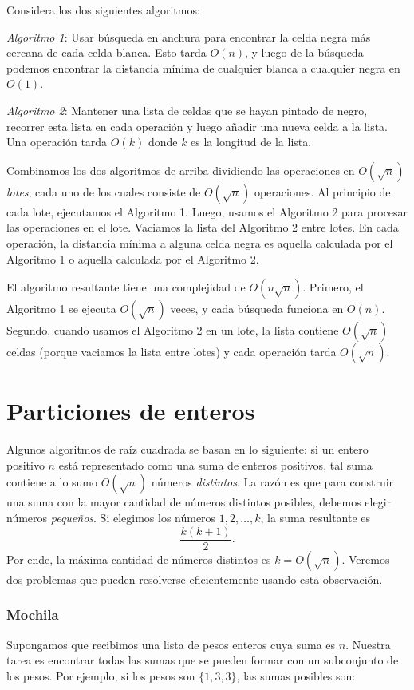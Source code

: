 Considera los dos siguientes algoritmos:

\emph{Algoritmo 1}: Usar búsqueda en anchura para encontrar la celda negra
más cercana de cada celda blanca. Esto tarda $O(n)$, y luego de la búsqueda
podemos encontrar la distancia mínima de cualquier blanca a cualquier negra
en $O(1)$.

\emph{Algoritmo 2}: Mantener una lista de celdas que se hayan pintado de
negro, recorrer esta lista en cada operación y luego añadir una nueva
celda a la lista. Una operación tarda $O(k)$ donde $k$ es la longitud
de la lista.

Combinamos los dos algoritmos de arriba dividiendo las operaciones en
$O(\sqrt n)$ \emph{lotes}, cada uno de los cuales consiste de $O(\sqrt n)$
operaciones. Al principio de cada lote, ejecutamos el Algoritmo 1. Luego,
usamos el Algoritmo 2 para procesar las operaciones en el lote. Vaciamos
la lista del Algoritmo 2 entre lotes. En cada operación, la distancia
mínima a alguna celda negra es aquella calculada por el Algoritmo 1
o aquella calculada por el Algoritmo 2.

El algoritmo resultante tiene una complejidad de $O(n \sqrt n)$. Primero,
el Algoritmo 1 se ejecuta $O(\sqrt n)$ veces, y cada búsqueda funciona en
$O(n)$. Segundo, cuando usamos el Algoritmo 2 en un lote, la lista contiene
$O(\sqrt n)$ celdas (porque vaciamos la lista entre lotes) y cada operación
tarda $O(\sqrt n)$.

\section{Particiones de enteros}

Algunos algoritmos de raíz cuadrada se basan en lo siguiente:
si un entero positivo $n$ está representado como una suma de enteros
positivos, tal suma contiene a lo sumo $O(\sqrt n)$ números
\emph{distintos}. La razón es que para construir una suma con la mayor
cantidad de números distintos posibles, debemos elegir números
\emph{pequeños}. Si elegimos los números $1,2,\ldots,k$, la suma resultante
es \[\frac{k(k+1)}{2}.\] Por ende, la máxima cantidad de números distintos
es $k = O(\sqrt n)$. Veremos dos problemas que pueden resolverse
eficientemente usando esta observación.

\subsubsection{Mochila}

Supongamos que recibimos una lista de pesos enteros cuya suma es $n$.
Nuestra tarea es encontrar todas las sumas que se pueden formar con un
subconjunto de los pesos. Por ejemplo, si los pesos son $\{1,3,3\}$,
las sumas posibles son:

